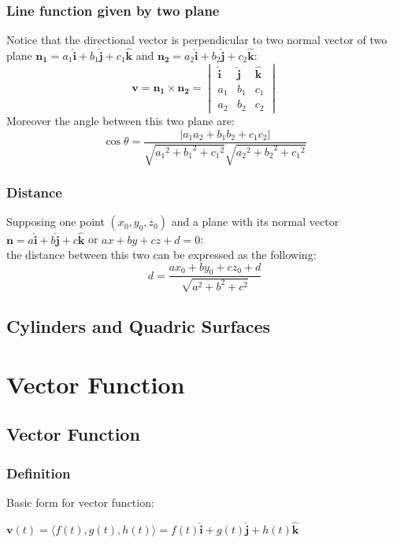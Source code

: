 \documentclass[UTF8,a4paper, 10pt, openany]{svmono}
\begin{document}
\subsection{Line function given by two plane}
Notice that the directional vector is perpendicular to two normal vector of two plane $\mathbf{n_1}=a_1\mathbf{\hat{i}}+b_1\mathbf{\hat{j}}+c_1\mathbf{\hat{k}}$ and $\mathbf{n_2}=a_2\mathbf{\hat{i}}+b_2\mathbf{\hat{j}}+c_2\mathbf{\hat{k}}$:
\begin{equation}
\boxed{\mathbf{v}=\mathbf{n_1}\times \mathbf{n_2}=
\begin{vmatrix}
\mathbf{\hat{i}} & \mathbf{\hat{j}} & \mathbf{\hat{k}}\\
a_1 & b_1 & c_1 \\
a_2 & b_2 & c_2
\end{vmatrix}
}
\end{equation}
Moreover the angle between this two plane are:
\begin{equation}
\boxed{\cos \theta =\dfrac{|a_1a_2+b_1b_2+c_1c_2|}{\sqrt{{a_1}^2+{b_1}^2+{c_1}^2}\sqrt{{a_2}^2+{b_2}^2+{c_1}^2}}}
\end{equation}

\subsection{Distance}
Supposing one point $(x_0,y_0,z_0)$ and a plane with its normal vector $\mathbf{n}=a\mathbf{\hat{i}}+b\mathbf{\hat{j}}+c\mathbf{\hat{k}}$ or $ax+by+cz+d=0$:\\
the distance between this two can be expressed as the following:
\begin{equation}
\boxed{d=\dfrac{ax_0+by_0+cz_0+d}{\sqrt{a^2+b^2+c^2}}}
\end{equation}

\section{Cylinders and Quadric Surfaces}

\chapter{Vector Function}
\section{Vector Function}
\subsection{Definition}
Basic form for vector function:
\begin{center}
$\mathbf{v}(t)=\langle f(t),g(t),h(t)\rangle=f(t)\mathbf{\hat{i}}+g(t)\mathbf{\hat{j}}+h(t)\mathbf{\hat{k}}$
\end{center}
\end{document}
